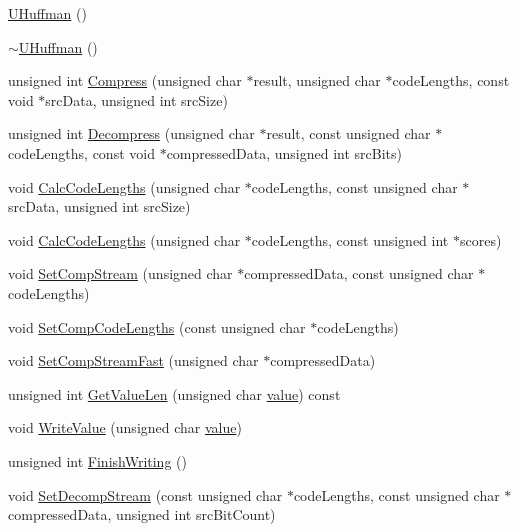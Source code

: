 \begin{CompactItemize}
\item 
\hyperlink{class_u_huffman_1f62da0268315dfc2699b2998bfbdfd4}{UHuffman} ()
\item 
\hyperlink{class_u_huffman_551d4efdc547d787e21ce00df8d9620b}{$\sim$UHuffman} ()
\item 
unsigned int \hyperlink{class_u_huffman_b67d54176bba1e872cbd7f5cf1f7da97}{Compress} (unsigned char $\ast$result, unsigned char $\ast$codeLengths, const void $\ast$srcData, unsigned int srcSize)
\item 
unsigned int \hyperlink{class_u_huffman_346391382b61c9da44b8895bcd2ccf6b}{Decompress} (unsigned char $\ast$result, const unsigned char $\ast$codeLengths, const void $\ast$compressedData, unsigned int srcBits)
\item 
void \hyperlink{class_u_huffman_bb7d56fc7fe5ac6c8176dcec7e33fb16}{CalcCodeLengths} (unsigned char $\ast$codeLengths, const unsigned char $\ast$srcData, unsigned int srcSize)
\item 
void \hyperlink{class_u_huffman_21fec644cfad4256adf8a14564945467}{CalcCodeLengths} (unsigned char $\ast$codeLengths, const unsigned int $\ast$scores)
\item 
void \hyperlink{class_u_huffman_40bee73e851e01e05190575b1e11e4bd}{SetCompStream} (unsigned char $\ast$compressedData, const unsigned char $\ast$codeLengths)
\item 
void \hyperlink{class_u_huffman_9597786e7e70571b8d790728380b71ac}{SetCompCodeLengths} (const unsigned char $\ast$codeLengths)
\item 
void \hyperlink{class_u_huffman_9787e1690a35cb0338b9225a2699b01e}{SetCompStreamFast} (unsigned char $\ast$compressedData)
\item 
unsigned int \hyperlink{class_u_huffman_6983a5b88a551be8221fcd69b1dfa6b7}{GetValueLen} (unsigned char \hyperlink{glext__bak_8h_6a4f8a1a444e9080b297963b3db29fe0}{value}) const 
\item 
void \hyperlink{class_u_huffman_0eda249aa726754bc2c936f81d38dd7f}{WriteValue} (unsigned char \hyperlink{glext__bak_8h_6a4f8a1a444e9080b297963b3db29fe0}{value})
\item 
unsigned int \hyperlink{class_u_huffman_516c71caadbb3ae69cff3d66453c140f}{FinishWriting} ()
\item 
void \hyperlink{class_u_huffman_4724b209df72141b8f40cdff1ce67c0e}{SetDecompStream} (const unsigned char $\ast$codeLengths, const unsigned char $\ast$compressedData, unsigned int srcBitCount)
\item 

\end{CompactItemize}
